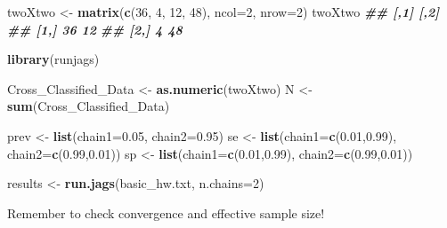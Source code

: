 \documentclass[
  ignorenonframetext,
]{beamer}
\newenvironment{Shaded}{\begin{snugshade}}{\end{snugshade}}
\newcommand{\AttributeTok}[1]{\textcolor[rgb]{0.13,0.29,0.53}{#1}}
\newcommand{\DecValTok}[1]{\textcolor[rgb]{0.00,0.00,0.81}{#1}}
\newcommand{\DocumentationTok}[1]{\textcolor[rgb]{0.56,0.35,0.01}{\textbf{\textit{#1}}}}
\newcommand{\FloatTok}[1]{\textcolor[rgb]{0.00,0.00,0.81}{#1}}
\newcommand{\FunctionTok}[1]{\textcolor[rgb]{0.13,0.29,0.53}{\textbf{#1}}}
\newcommand{\NormalTok}[1]{#1}
\newcommand{\OtherTok}[1]{\textcolor[rgb]{0.56,0.35,0.01}{#1}}
\newcommand{\StringTok}[1]{\textcolor[rgb]{0.31,0.60,0.02}{#1}}
\begin{document}
\begin{frame}[fragile]
\scriptsize

\begin{Shaded}
\begin{Highlighting}[]
\NormalTok{twoXtwo }\OtherTok{\textless{}{-}} \FunctionTok{matrix}\NormalTok{(}\FunctionTok{c}\NormalTok{(}\DecValTok{36}\NormalTok{, }\DecValTok{4}\NormalTok{, }\DecValTok{12}\NormalTok{, }\DecValTok{48}\NormalTok{), }\AttributeTok{ncol=}\DecValTok{2}\NormalTok{, }\AttributeTok{nrow=}\DecValTok{2}\NormalTok{)}
\NormalTok{twoXtwo}
\DocumentationTok{\#\#      [,1] [,2]}
\DocumentationTok{\#\# [1,]   36   12}
\DocumentationTok{\#\# [2,]    4   48}
\end{Highlighting}
\end{Shaded}

\normalsize

\scriptsize

\begin{Shaded}
\begin{Highlighting}[]
\FunctionTok{library}\NormalTok{(}\StringTok{\textquotesingle{}runjags\textquotesingle{}}\NormalTok{)}

\NormalTok{Cross\_Classified\_Data }\OtherTok{\textless{}{-}} \FunctionTok{as.numeric}\NormalTok{(twoXtwo)}
\NormalTok{N }\OtherTok{\textless{}{-}} \FunctionTok{sum}\NormalTok{(Cross\_Classified\_Data)}

\NormalTok{prev }\OtherTok{\textless{}{-}} \FunctionTok{list}\NormalTok{(}\AttributeTok{chain1=}\FloatTok{0.05}\NormalTok{, }\AttributeTok{chain2=}\FloatTok{0.95}\NormalTok{)}
\NormalTok{se }\OtherTok{\textless{}{-}} \FunctionTok{list}\NormalTok{(}\AttributeTok{chain1=}\FunctionTok{c}\NormalTok{(}\FloatTok{0.01}\NormalTok{,}\FloatTok{0.99}\NormalTok{), }\AttributeTok{chain2=}\FunctionTok{c}\NormalTok{(}\FloatTok{0.99}\NormalTok{,}\FloatTok{0.01}\NormalTok{))}
\NormalTok{sp }\OtherTok{\textless{}{-}} \FunctionTok{list}\NormalTok{(}\AttributeTok{chain1=}\FunctionTok{c}\NormalTok{(}\FloatTok{0.01}\NormalTok{,}\FloatTok{0.99}\NormalTok{), }\AttributeTok{chain2=}\FunctionTok{c}\NormalTok{(}\FloatTok{0.99}\NormalTok{,}\FloatTok{0.01}\NormalTok{))}

\NormalTok{results }\OtherTok{\textless{}{-}} \FunctionTok{run.jags}\NormalTok{(}\StringTok{\textquotesingle{}basic\_hw.txt\textquotesingle{}}\NormalTok{, }\AttributeTok{n.chains=}\DecValTok{2}\NormalTok{)}
\end{Highlighting}
\end{Shaded}

\normalsize

Remember to check convergence and effective sample size!
\end{frame}
\end{document}
